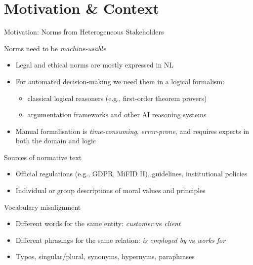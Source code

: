 \documentclass[presentation]{beamer}
\begin{document}
\section[Background]{Motivation \& Context}

{
\usebackgroundtemplate{}

\begin{frame}{Motivation: Norms from Heterogeneous Stakeholders}

\begin{block}{Norms need to be \emph{machine-usable}}
\begin{itemize}
    \item Legal and ethical norms are mostly expressed in NL
    \item For automated decision-making we need them in a \alert{logical formalism}:
    \begin{itemize}
        \item classical logical reasoners (e.g., first-order theorem provers)
        \item argumentation frameworks and other AI reasoning systems~\cite{DBLP:conf/aies/LiaoST19,DBLP:journals/jair/LiaoPST23}
    \end{itemize}
    \item Manual formalisation is \emph{time-consuming}, \emph{error-prone}, and requires experts in both the domain and logic
\end{itemize}
\end{block}

\begin{block}{Sources of normative text}
\begin{itemize}
    \item Official regulations (e.g., GDPR, MiFID II), guidelines, institutional policies
    \item Individual or group descriptions of moral values and principles
\end{itemize}
\end{block}

\begin{block}{Vocabulary misalignment}
\begin{itemize}
    \item Different words for the same entity: \emph{customer} vs \emph{client}
    \item Different phrasings for the same relation: \emph{is employed by} vs \emph{works for}
    \item Typos, singular/plural, synonyms, hypernyms, paraphrases
\end{itemize}
\end{block}


\end{frame}}
\end{document}

